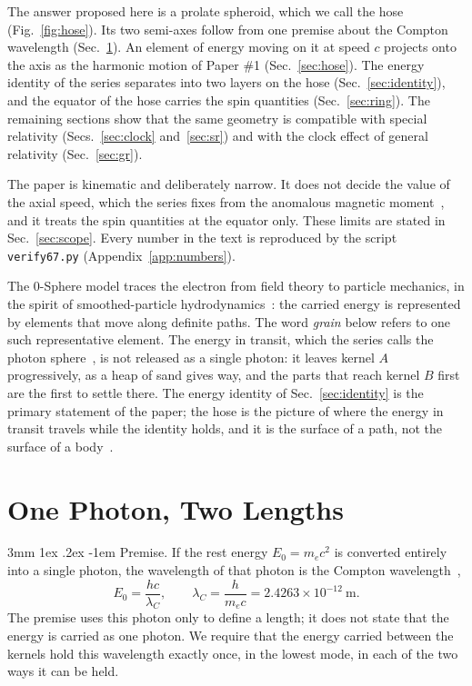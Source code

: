 \documentclass[%
 reprint, amsmath,amssymb, aps, prb, ]{revtex4-2}
\makeatletter
\numberwithin{equation}{section}
\renewcommand\paragraph{%
  \@startsection{paragraph}{4}{\z@}%
    {3mm \@plus 1ex \@minus .2ex}%
    {-1em}%
    {\normalfont\normalsize\itshape}}
\newcommand{\lamC}{\lambda_C}
\makeatother
\begin{document}
The answer proposed here is a prolate spheroid, which we call the hose (Fig.~\ref{fig:hose}). Its two semi-axes follow from one premise about the Compton wavelength (Sec.~\ref{sec:premise}). An element of energy moving on it at speed $c$ projects onto the axis as the harmonic motion of Paper \#1 (Sec.~\ref{sec:hose}). The energy identity of the series separates into two layers on the hose (Sec.~\ref{sec:identity}), and the equator of the hose carries the spin quantities (Sec.~\ref{sec:ring}). The remaining sections show that the same geometry is compatible with special relativity (Secs.~\ref{sec:clock} and~\ref{sec:sr}) and with the clock effect of general relativity (Sec.~\ref{sec:gr}).

The paper is kinematic and deliberately narrow. It does not decide the value of the axial speed, which the series fixes from the anomalous magnetic moment~\cite{H10,H66}, and it treats the spin quantities at the equator only. These limits are stated in Sec.~\ref{sec:scope}. Every number in the text is reproduced by the script \texttt{verify67.py} (Appendix~\ref{app:numbers}).

The 0-Sphere model traces the electron from field theory to particle mechanics, in the spirit of smoothed-particle hydrodynamics~\cite{Monaghan1992}: the carried energy is represented by elements that move along definite paths. The word \emph{grain} below refers to one such representative element. The energy in transit, which the series calls the photon sphere~\cite{H66}, is not released as a single photon: it leaves kernel $A$ progressively, as a heap of sand gives way, and the parts that reach kernel $B$ first are the first to settle there. The energy identity of Sec.~\ref{sec:identity} is the primary statement of the paper; the hose is the picture of where the energy in transit travels while the identity holds, and it is the surface of a path, not the surface of a body~\cite{H01}.

\section{One Photon, Two Lengths}
\label{sec:premise}

\paragraph{Premise.} If the rest energy $E_0 = m_ec^2$ is converted entirely into a single photon, the wavelength of that photon is the Compton wavelength~\cite{Compton1923},
\begin{equation}
E_0 = \frac{hc}{\lamC}, \qquad \lamC = \frac{h}{m_ec} = 2.4263\times10^{-12}\ \text{m}.
\label{eq:lamC}
\end{equation}
The premise uses this photon only to define a length; it does not state that the energy is carried as one photon. We require that the energy carried between the kernels hold this wavelength exactly once, in the lowest mode, in each of the two ways it can be held.
\end{document}
